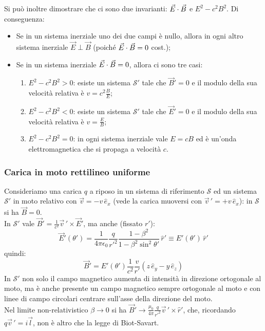 Si può inoltre dimostrare che ci sono due invarianti: $ \vec{E}\cdot\vec{B} $ e $ E^2 - c^2B^2 $. Di conseguenza:
\begin{itemize}
	\item Se in un sistema inerziale uno dei due campi è nullo, allora in ogni altro sistema inerziale $ \vec{E}\perp\vec{B} $ (poiché $ \vec{E}\cdot\vec{B} = 0 $ cost.);
	\item Se in un sistema inerziale $ \vec{E}\cdot\vec{B} = 0 $, allora ci sono tre casi:
	\begin{enumerate}
		\item $ E^2 - c^2B^2 > 0 $: esiste un sistema $ \mathcal{S}' $ tale che $ \vec{B}' = 0 $ e il modulo della sua velocità relativa è $ v = c^2 \frac{B}{E} $;
		\item $ E^2 - c^2B^2 < 0 $: esiste un sistema $ \mathcal{S}' $ tale che $ \vec{E}' = 0 $ e il modulo della sua velocità relativa è $ v = \frac{E}{B} $;
		\item $ E^2 - c^2B^2 = 0 $: in ogni sistema inerziale vale $ E = c B $ ed è un'onda elettromagnetica che si propaga a velocità $ c $.
	\end{enumerate}
\end{itemize}

\subsubsection{Carica in moto rettilineo uniforme}

Consideriamo una carica $ q $ a riposo in un sistema di riferimento $ \mathcal{S} $ ed un sistema $ \mathcal{S}' $ in moto relativo con $ \vec{v} = -v\,\hat{e}_x $ (vede la carica muoversi con $ \vec{v}\,' = +v\,\hat{e}_x $): in $ \mathcal{S} $ si ha $ \vec{B} = 0 $. \\ 
In $ \mathcal{S}' $ vale $ \vec{B}' = \frac{1}{c^2} \vec{v}\,'\times\vec{E}' $, ma anche (fissato $ r' $):
\begin{equation}
	\vec{E}'(\theta') = \frac{1}{4\pi\epsilon_0} \frac{q}{r'^2} \frac{1 - \beta^2}{1 - \beta^2\sin^2\theta'} \,\hat{r}' \equiv E'(\theta') \,\hat{r}'
	\label{eq:47}
\end{equation}
quindi:
\begin{equation}
	\vec{B}' = E'(\theta')\frac{1}{c^2}\frac{v}{r'} (z\,\hat{e}_y - y\,\hat{e}_z)
	\label{eq:48}
\end{equation}
In $ \mathcal{S}' $ non solo il campo magnetico aumenta di intensità in direzione ortogonale al moto, ma è anche presente un campo magnetico sempre ortogonale al moto e con linee di campo circolari centrare sull'asse della direzione del moto. \\ 
Nel limite non-relativistico $ \beta \rightarrow 0 $ si ha $ \vec{B}' \rightarrow \frac{\mu_0}{4\pi}\frac{q}{r'^2}\vec{v}\,'\times\hat{r}' $, che, ricordando $ q\vec{v}\,' = i \vec{l} $, non è altro che la legge di Biot-Savart.

